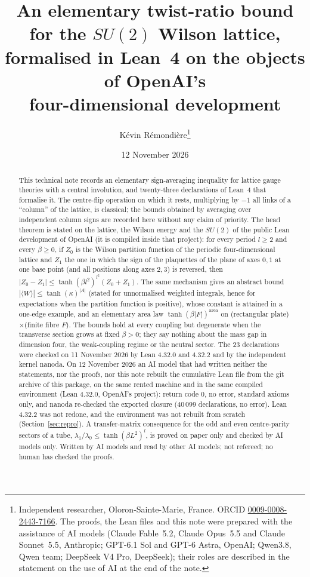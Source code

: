 \documentclass[11pt,a4paper]{article}
\title{An elementary twist-ratio bound for the $SU(2)$ Wilson lattice,\\ formalised in Lean~4 on the objects of OpenAI's\\ four-dimensional development}
\author{K\'evin R\'emondi\`ere\thanks{Independent researcher, Oloron-Sainte-Marie, France. ORCID
\href{https://orcid.org/0009-0008-2443-7166}{0009-0008-2443-7166}. The proofs, the Lean files and this note were
prepared with the assistance of AI models (Claude Fable~5.2, Claude Opus~5.5 and Claude Sonnet~5.5, Anthropic; GPT-6.1 Sol and GPT-6 Astra, OpenAI; Qwen3.8, Qwen team; DeepSeek V4 Pro, DeepSeek); their roles are described in the
statement on the use of AI at the end of the note.}}
\date{12 November 2026}
\theoremstyle{plain}
\theoremstyle{definition}
\theoremstyle{remark}
\numberwithin{equation}{section}
\begin{document}
\maketitle

\begin{abstract}
This technical note records an elementary sign-averaging inequality for lattice gauge theories with a central involution, and twenty-three declarations of Lean~4 that formalise it. The centre-flip operation on which it rests, multiplying by $-1$ all links of a ``column'' of the lattice, is classical; the bounds obtained by averaging over independent column signs are recorded here without any claim of priority. The head theorem is stated on the lattice, the Wilson energy and the $SU(2)$ of the public Lean development of OpenAI (it is compiled inside that project): for every period $l\ge2$ and every $\beta\ge0$, if $Z_0$ is the Wilson partition function of the periodic four-dimensional lattice and $Z_1$ the one in which the sign of the plaquettes of the plane of axes $0,1$ at one base point (and all positions along axes $2,3$) is reversed, then $|Z_0-Z_1|\le\tanh(\beta l^2)^{l^2}(Z_0+Z_1)$. The same mechanism gives an abstract bound $|\langle W\rangle|\le\tanh(\kappa)^{|A|}$ (stated for unnormalised weighted integrals, hence for expectations when the partition function is positive), whose constant is attained in a one-edge example, and an elementary area law $\tanh(\beta|F|)^{\mathrm{area}}$ on (rectangular plate)$\times$(finite fibre $F$). The bounds hold at every coupling but degenerate when the transverse section grows at fixed $\beta>0$; they say nothing about the mass gap in dimension four, the weak-coupling regime or the neutral sector. The 23 declarations were checked on 11 November 2026 by Lean 4.32.0 and 4.32.2 and by the independent kernel nanoda. On 12 November 2026 an AI model that had written neither the statements, nor the proofs, nor this note rebuilt the cumulative Lean file from the git archive of this package, on the same rented machine and in the same compiled environment (Lean 4.32.0, OpenAI's project): return code 0, no error, standard axioms only, and nanoda re-checked the exported closure (40\,099 declarations, no error). Lean 4.32.2 was not redone, and the environment was not rebuilt from scratch (Section~\ref{sec:repro}). A transfer-matrix consequence for the odd and even centre-parity sectors of a tube, $\lambda_1/\lambda_0\le\tanh(\beta L^2)^l$, is proved on paper only and checked by AI models only. Written by AI models and read by other AI models; not refereed; no human has checked the proofs.
\end{abstract}
\end{document}

